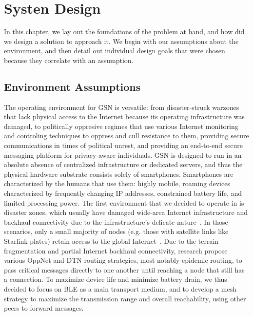 \chapter{Systen Design}
\label{chap:design}
In this chapter, we lay out the foundations of the problem at hand, and how did we design a solution to approach it. We begin with our assumptions about the environment, and then detail out individual design goals that were chosen because they correlate with an assumption.
\section{Environment Assumptions}
\label{sec:ass}
The operating environment for GSN is versatile: from disaster-struck warzones that lack physical access to the Internet because its operating infrastructure was damaged, to politically oppresive regimes that use various Internet monitoring and controling techniques to oppress and cull resistance to them, providing secure communications in times of political unrest, and providing an end-to-end secure messaging platform for privacy-aware individuals.
GSN is designed to run in an absolute absence of centralized infrastructure or dedicated servers, and thus the physical hardware substrate consists solely of smartphones. Smartphones are characterized by the humans that use them: highly mobile, roaming devices characterized by frequently changing IP addresses, constrained battery life, and limited processing power.
The first environment that we decided to operate in is disaster zones, which usually have damaged wide-area Internet infrastructure and backhaul connectivity due to the infrastructure's delicate nature~\cite{Legendre2011,Liu2026,Hasan2025}. In those scenarios, only a small majority of nodes (e.g. those with satellite links like Starlink plates) retain access to the global Internet~\cite{Liu2026}. Due to the terrain fragmentation and partial Internet backhaul connectivity, research propose various OppNet and DTN routing strategies, most notably epidemic routing, to pass critical messages directly to one another until reaching a node that still has a connection. To maximize device life and minimize battery drain, we thus decided to focus on BLE as a main transport medium, and to develop a mesh strategy to maximize the transmission range and overall reachability, using other peers to forward messages.
